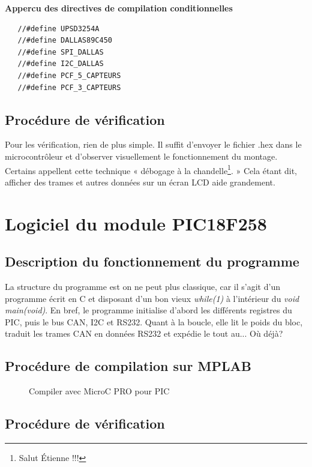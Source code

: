 \documentclass[10pt,a4paper,final]{article}
\begin{document}
\textbf{Appercu des directives de compilation conditionnelles}
\begin{lstlisting}
   //#define UPSD3254A
   //#define DALLAS89C450
   //#define SPI_DALLAS
   //#define I2C_DALLAS
   //#define PCF_5_CAPTEURS
   //#define PCF_3_CAPTEURS
\end{lstlisting}
\begin{spacing}{1.5}

\subsection{Procédure de vérification}
Pour les vérification, rien de plus simple. Il suffit d'envoyer le fichier .hex dans le microcontrôleur et d'observer visuellement le fonctionnement du montage. Certains appellent cette technique « débogage à la chandelle\footnote{Salut Étienne !!!}. » Cela étant dit, afficher des trames et autres données sur un écran LCD aide grandement.

\pagebreak
\section{Logiciel du module PIC18F258}
\subsection{Description du fonctionnement du programme}
La structure du programme est on ne peut plus classique, car il s'agit d'un programme écrit en C et disposant d'un bon vieux \emph{while(1)} à l'intérieur du \emph{void main(void)}. En bref, le programme initialise d'abord les différents registres du PIC, puis le bus CAN, I2C et RS232. Quant à la boucle, elle lit le poids du bloc, traduit les trames CAN en données RS232 et expédie le tout au... Où déjà?
\subsection{Procédure de compilation sur MPLAB}
\begin{figure}[hbtp]
\caption{Compiler avec MicroC PRO pour PIC}
\centering
{}
\end{figure}

\subsection{Procédure de vérification}



\end{spacing}






\end{document}
